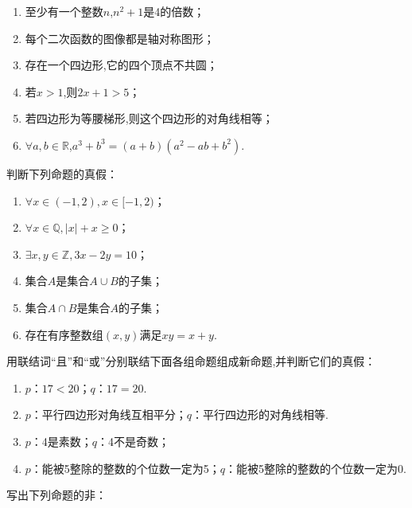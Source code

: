 \documentclass[lang=cn,math=cm,chinesefont=nofont,11pt,scheme=chinese,twocol]{elegantbook}
\begin{document}
\begin{enumerate}
  \item 至少有一个整数$n$,$n^2+1$是4的倍数；
  \item 每个二次函数的图像都是轴对称图形；
  \item 存在一个四边形,它的四个顶点不共圆；
  \item 若$x>1$,则$2x+1>5$；
  \item 若四边形为等腰梯形,则这个四边形的对角线相等；
   \item $\forall a,b{\in}\mathbb{R}$,$a^3+b^3=(a+b)(a^2-ab+b^2)$.
\end{enumerate}

\begin{exercise}
  判断下列命题的真假：
\end{exercise}

\begin{enumerate}
  \item $\forall x\in(-1, 2), x\in[-1, 2)$；
  \item $\forall x\in\mathbb{Q}, |x|+x\geqslant0$；
  \item $\exists x,y\in\mathbb{Z},3x-2y=10$；
  \item 集合$A$是集合$A\cup B$的子集；
  \item 集合$A\cap B$是集合$A$的子集；
  \item 存在有序整数组$(x,y)$满足$xy=x+y$.
\end{enumerate}

\begin{exercise}
  用联结词“且”和“或”分别联结下面各组命题组成新命题,并判断它们的真假：
\end{exercise}

\begin{enumerate}
  \item $p$：$17<20$；$q$：$17=20$.
  \item $p$：平行四边形对角线互相平分；$q$：平行四边形的对角线相等.
  \item $p$：4是素数；$q$：4不是奇数；
  \item $p$：能被5整除的整数的个位数一定为5；$q$：能被5整除的整数的个位数一定为0.
\end{enumerate}

\begin{exercise}
  写出下列命题的非：
\end{exercise}
\end{document}
